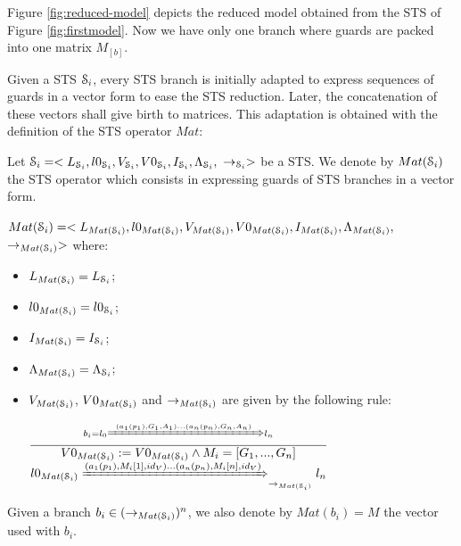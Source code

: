 Figure \ref{fig:reduced-model} depicts the reduced model obtained
from the STS of Figure \ref{fig:firstmodel}. Now we have only one
branch where guards are packed into one matrix $M_{[b]}$.


Given a STS $\EuScript{S}_i$, every STS branch is initially
adapted to express sequences of guards in a vector form to ease
the STS reduction. Later, the concatenation of these vectors
shall give birth to matrices. This adaptation is obtained with
the definition of the STS operator $Mat$:

\begin{definition}
\label{rule:matrix}
  Let $\EuScript{S}_i=<L_{\EuScript{S}_i},l0_{\EuScript{S}_i},V_{\EuScript{S}_i},V0_{\EuScript{S}_i},I_{\EuScript{S}_i},\Lambda_{\EuScript{S}_i},$
  $\rightarrow_{\EuScript{S}_i}>$ be a STS. We denote by
  $Mat(\EuScript{S}_i)$ the STS operator which consists in
  expressing guards of STS branches in a vector form.

  $Mat(\EuScript{S}_i)=<L_{Mat(\EuScript{S}_i)},l0_{Mat(\EuScript{S}_i)},V_{Mat(\EuScript{S}_i)},V0_{Mat(\EuScript{S}_i)},I_{Mat(\EuScript{S}_i)},\Lambda_{Mat(\EuScript{S}_i)},$
  $\rightarrow_{Mat(\EuScript{S}_i)}>$ where:

	\begin{itemize}
    \item $L_{Mat(\EuScript{S}_i)}=L_{\EuScript{S}_i}$;
    \item $l0_{Mat(\EuScript{S}_i)}=l0_{\EuScript{S}_i}$;
    \item $I_{Mat(\EuScript{S}_i)}=I_{\EuScript{S}_i}$;
    \item $\Lambda_{Mat(\EuScript{S}_i)} = \Lambda_{\EuScript{S}_i}$;

    \item $V_{Mat(\EuScript{S}_i)}$, $V0_{Mat(\EuScript{S}_i)}$
      and $\rightarrow_{Mat(\EuScript{S}_i)}$ are given by the
      following rule:

    \begin{center}
    {\Large
    $\frac{b_i=l_0 \xRightarrow{(a_1(p_1),G_1,A_1)...(a_n(p_n),G_n,A_n)} l_n}{
      \begin{matrix}
        V0_{Mat(\EuScript{S}_i)}:=V0_{Mat(\EuScript{S}_i)} \wedge M_{i}=[G_1,...,G_n]\\
        l0_{Mat(\EuScript{S}_i)} \xRightarrow{(a_1(p_1),M_i[1],id_V) ...(a_n(p_n),M_i[n],id_V) }_{\rightarrow_{Mat(\EuScript{S}_i)}} l_n\\
      \end{matrix}
    }$
    }
    \end{center}
  \end{itemize}

  Given a branch $b_i \in (\rightarrow_{Mat(\EuScript{S}_i)})^n$,
  we also denote by $Mat(b_i)=M$ the vector used with $b_i$.
\end{definition}

